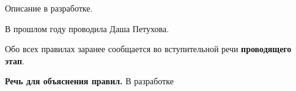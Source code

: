 
\par Описание в разработке.

\par В прошлом году проводила Даша Петухова.

\par Обо всех правилах заранее сообщается во вступительной речи \textbf{проводящего этап}.

\par \textbf{Речь для объяснения правил.} В разработке